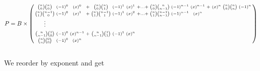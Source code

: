 \begin{gather*}
    P=B \times
    \begin{psmallmatrix}
        {n \choose 0}    {n \choose 0}   & (-1)^{0} & (x)^{0}   & + & {n \choose 0}    {n \choose 1}   & (-1)^{1} & (x)^{1} & + \hdots + & {n \choose 0}  {n \choose n-1}   & (-1)^{n-1} & (x)^{n-1} & + & (x)^{n} & {n \choose 0}  {n \choose n} & (-1)^{n} \\
        {n \choose 1}    {n-1 \choose 0} & (-1)^{0} & (x)^{1}   & + & {n \choose 1}    {n-1 \choose 1} & (-1)^{1} & (x)^{2} & + \hdots + & {n \choose 1}  {n-1 \choose n-1} & (-1)^{n-1} & (x)^{n}                                                           \\
        \vdots                                                                                                                                                                                                                                               \\
        & \\
        {n \choose n-1} {1 \choose 0}    & (-1)^{0} & (x)^{n-1} & + & {n \choose n-1}  {1 \choose 1}   & (-1)^{1} & (x)^{n}                                                                                                                                  \\
        {n \choose n}    {0 \choose 0}   & (-1)^{0} & (x)^{n}                                                                                                                                                                                                \\
    \end{psmallmatrix}
\end{gather*}
\\ We reorder by exponent and get

